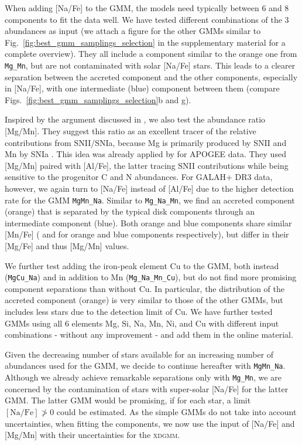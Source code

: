 \documentclass[fleqn,usenatbib]{mnras}
\begin{document}
When adding [Na/Fe] to the GMM, the models need typically between 6 and 8 components to fit the data well. We have tested different combinations of the 3 abundances as input (we attach a figure for the other GMMs similar to Fig.~\ref{fig:best_gmm_samplings_selection} in the supplementary material for a complete overview). They all include a component similar to the orange one from \texttt{Mg\_Mn}, but are not contaminated with solar [Na/Fe] stars. This leads to a clearer separation between the accreted component and the other components, especially in [Na/Fe], with one intermediate (blue) component between them (compare Figs.~\ref{fig:best_gmm_samplings_selection}b and g). 

Inspired by the argument discussed in \citet{Hawkins2015}, we also test the abundance ratio [Mg/Mn]. They suggest this ratio as an excellent tracer of the relative contributions from SNII/SNIa, because Mg is primarily produced by SNII \citep{Nomoto2013} and Mn by SNIa \citep{Gratton1989}. This idea was already applied by \citet{Das2020} for APOGEE data. They used [Mg/Mn] paired with [Al/Fe], the latter tracing SNII contributions while being sensitive to the progenitor C and N abundances. For GALAH+ DR3 data, however, we again turn to [Na/Fe] instead of [Al/Fe] due to the higher detection rate for the GMM \texttt{MgMn\_Na}. Similar to \texttt{Mg\_Na\_Mn}, we find an accreted component (orange) that is separated by the typical disk components through an intermediate component (blue). Both orange and blue components share similar [Mn/Fe] ( and  for orange and blue components respectively), but differ in their [Mg/Fe] and thus [Mg/Mn] values.

We further test adding the iron-peak element Cu to the GMM, both instead (\texttt{MgCu\_Na}) and in addition to Mn (\texttt{Mg\_Na\_Mn\_Cu}), but do not find more promising component separations than without Cu. In particular, the distribution of the accreted component (orange) is very similar to those of the other GMMs, but includes less stars due to the detection limit of Cu. We have further tested GMMs using all 6 elements Mg, Si, Na, Mn, Ni, and Cu with different input combinations - without any improvement - and add them in the online material.

Given the decreasing number of stars available for an increasing number of abundances used for the GMM, we decide to continue hereafter with \texttt{MgMn\_Na}. Although we already achieve remarkable separations only with \texttt{Mg\_Mn}, we are concerned by the contamination of stars with super-solar [Na/Fe] for the latter GMM. The latter GMM would be promising, if for each star, a limit $\mathrm{[Na/Fe]} \ngtr 0$ could be estimated. As the simple GMMs do not take into account uncertainties, when fitting the components, we now use the input of [Na/Fe] and [Mg/Mn] with their uncertainties for the \textsc{xdgmm}.
\end{document}
